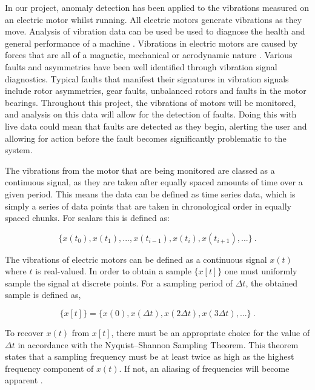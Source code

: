 In our project, anomaly detection has been applied to the vibrations measured on an electric motor whilst running. All electric motors generate vibrations as they move. Analysis of vibration data can be used be used to diagnose the health and general performance of a machine \cite{DelgadoArredondo2017568}. Vibrations in electric motors are caused by forces that are all of a magnetic, mechanical or aerodynamic nature \cite{dorrell_smith_1996}. Various faults and asymmetries have been well identified through vibration signal diagnostics. Typical faults that manifest their signatures in vibration signals include rotor asymmetries, gear faults, unbalanced rotors and faults in the motor bearings. Throughout this project, the vibrations of motors will be monitored, and analysis on this data will allow for the detection of faults. Doing this with live data could mean that faults are detected as they begin, alerting the user and allowing for action before the fault becomes significantly problematic to the system.

The vibrations from the motor that are being monitored are classed as a continuous signal, as they are taken after equally spaced amounts of time over a given period. This means the data can be defined as time series data, which is simply a series of data points that are taken in chronological order in equally spaced chunks. For scalars this is defined as:

\begin{equation}
    \{x(t_0), x(t_1), ..., x(t_{i-1}), x(t_i), x(t_{i+1}), ...\}~.
\end{equation}

The vibrations of electric motors can be defined as a continuous signal $x(t)$ where $t$ is real-valued. In order to obtain a sample $\{x[t]\}$ one must uniformly sample the signal at discrete points. For a sampling period of $\Delta t$, the obtained sample is defined as,

\begin{equation}
    \{x[t]\} = \{x(0), x(\Delta t), x(2\Delta t), x(3\Delta t),...\}~.
\end{equation}

To recover $x(t)$ from $x[t]$, there must be an appropriate choice for the value of $\Delta t$ in accordance with the Nyquist–Shannon Sampling Theorem. This theorem states that a sampling frequency must be at least twice as high as the highest frequency component of $x(t)$. If not, an aliasing of frequencies will become apparent \cite{Ficker2015}.

